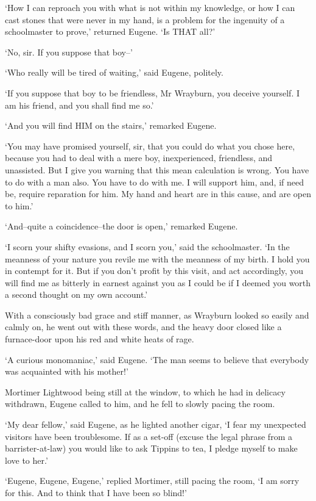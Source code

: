 ‘How I can reproach you with what is not within my knowledge, or how
I can cast stones that were never in my hand, is a problem for the
ingenuity of a schoolmaster to prove,’ returned Eugene. ‘Is THAT all?’

‘No, sir. If you suppose that boy--’

‘Who really will be tired of waiting,’ said Eugene, politely.

‘If you suppose that boy to be friendless, Mr Wrayburn, you deceive
yourself. I am his friend, and you shall find me so.’

‘And you will find HIM on the stairs,’ remarked Eugene.

‘You may have promised yourself, sir, that you could do what you
chose here, because you had to deal with a mere boy, inexperienced,
friendless, and unassisted. But I give you warning that this mean
calculation is wrong. You have to do with a man also. You have to do
with me. I will support him, and, if need be, require reparation for
him. My hand and heart are in this cause, and are open to him.’

‘And--quite a coincidence--the door is open,’ remarked Eugene.

‘I scorn your shifty evasions, and I scorn you,’ said the schoolmaster.
‘In the meanness of your nature you revile me with the meanness of my
birth. I hold you in contempt for it. But if you don’t profit by this
visit, and act accordingly, you will find me as bitterly in earnest
against you as I could be if I deemed you worth a second thought on my
own account.’

With a consciously bad grace and stiff manner, as Wrayburn looked so
easily and calmly on, he went out with these words, and the heavy door
closed like a furnace-door upon his red and white heats of rage.

‘A curious monomaniac,’ said Eugene. ‘The man seems to believe that
everybody was acquainted with his mother!’

Mortimer Lightwood being still at the window, to which he had in
delicacy withdrawn, Eugene called to him, and he fell to slowly pacing
the room.

‘My dear fellow,’ said Eugene, as he lighted another cigar, ‘I fear my
unexpected visitors have been troublesome. If as a set-off (excuse the
legal phrase from a barrister-at-law) you would like to ask Tippins to
tea, I pledge myself to make love to her.’

‘Eugene, Eugene, Eugene,’ replied Mortimer, still pacing the room, ‘I am
sorry for this. And to think that I have been so blind!’

